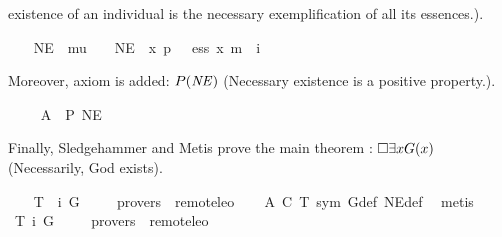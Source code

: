 \begin{isabellebody}
\begin{isamarkuptext}
existence of an individual is the necessary exemplification of all its essences.).%
\end{isamarkuptext}%
\isamarkuptrue%
\ \ \isamarkupfalse%
\ NE\ {\isacharcolon}{\isacharcolon}\ {\isachardoublequoteopen}mu\ {\isasymRightarrow}\ {\isasymsigma}{\isachardoublequoteclose}\ \ {\isachardoublequoteopen}NE\ {\isacharequal}\ {\isacharparenleft}{\isasymlambda}x{\isachardot}\ {\isasymforall}p\ {\isacharparenleft}{\isasymlambda}{\isasymPhi}{\isachardot}\ {\isasymPhi}\ ess\ x\ m{\isasymRightarrow}\ {\isasymbox}\ {\isacharparenleft}{\isasymexists}i\ {\isasymPhi}{\isacharparenright}{\isacharparenright}{\isacharparenright}{\isachardoublequoteclose}%
\begin{isamarkuptext}%
Moreover, axiom  is added: $P(\mathit{NE})$ (Necessary existence is a positive 
property.).%
\end{isamarkuptext}%
\isamarkuptrue%
\ \ \isamarkupfalse%
\ \ A{}{\isacharcolon}\ \ {\isachardoublequoteopen}{\isacharbrackleft}P\ NE{\isacharbrackright}{\isachardoublequoteclose}%
\begin{isamarkuptext}%
Finally, Sledgehammer and Metis prove the main theorem : $\Box \exists x G(x)$ 
(Necessarily, God exists).%
\end{isamarkuptext}%
\isamarkuptrue%
\ \ \isamarkupfalse%
\ T{}{\isacharcolon}\ {\isachardoublequoteopen}{\isacharbrackleft}{\isasymbox}\ {\isacharparenleft}{\isasymexists}i\ G{\isacharparenright}{\isacharbrackright}{\isachardoublequoteclose}\ \isanewline
\ \ \isamarkupfalse%
\ {\isacharbrackleft}provers\ {\isacharequal}\ remote{\isacharunderscore}leo{}{\isacharbrackright}\isanewline
%
\isadelimproof
\ \ %
\endisadelimproof
%
\isatagproof
{}\isamarkupfalse%
\ A{}\ C\ T{}\ sym\ G{\isacharunderscore}def\ NE{\isacharunderscore}def\ \isamarkupfalse%
\ metis%
\endisatagproof
{\isafoldproof}%
%
\isadelimproof
\isanewline
%
\endisadelimproof
\isanewline
\ \ \isamarkupfalse%
\ T{}{\isacharcolon}\ {\isachardoublequoteopen}{\isacharbrackleft}{\isasymexists}i\ G{\isacharbrackright}{\isachardoublequoteclose}\ \isanewline
\ \ \isamarkupfalse%
\ {\isacharbrackleft}provers\ {\isacharequal}\ remote{\isacharunderscore}leo{}{\isacharbrackright}\isanewline
%
\isadelimproof
\ \ %
\endisadelimproof
%
\isatagproof

\end{isabellebody}
